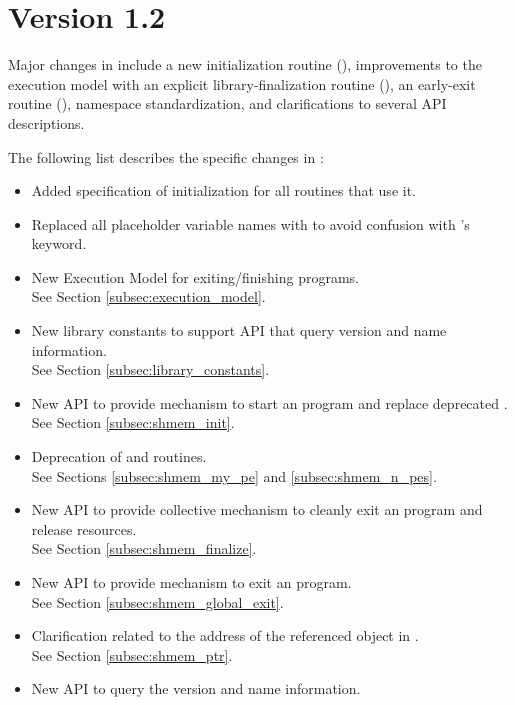 \section{Version 1.2}
Major changes in \openshmem[1.2] include
a new initialization routine (),
improvements to the execution model with an explicit
library-finalization routine (),
an early-exit routine (),
namespace standardization,
and clarifications to several API descriptions.

The following list describes the specific changes in \openshmem[1.2]:
\begin{itemize}
%
\item Added specification of  initialization for all routines that use it.
%
\item Replaced all placeholder variable names  with  to
      avoid confusion with \Fortran's  keyword.
%
\item New Execution Model for exiting/finishing \openshmem programs.
\\See Section  \ref{subsec:execution_model}.
%
\item New library constants to support API that query version and name information.
\\See Section \ref{subsec:library_constants}.
%
\item New API  to provide mechanism to start an \openshmem
      program and replace deprecated .
\\See Section \ref{subsec:shmem_init}.
%
\item Deprecation of  and  routines.
\\See Sections \ref{subsec:shmem_my_pe} and \ref{subsec:shmem_n_pes}.
%
\item New API  to provide collective mechanism to cleanly
      exit an \openshmem program and release resources.
\\See Section \ref{subsec:shmem_finalize}.
%
\item New API  to provide mechanism to exit an
    \openshmem program.
\\See Section \ref{subsec:shmem_global_exit}.
%
\item Clarification related to the address of the referenced object in
    .
\\See Section \ref{subsec:shmem_ptr}.
%
\item New API to query the version and name information. 

\end{itemize}
